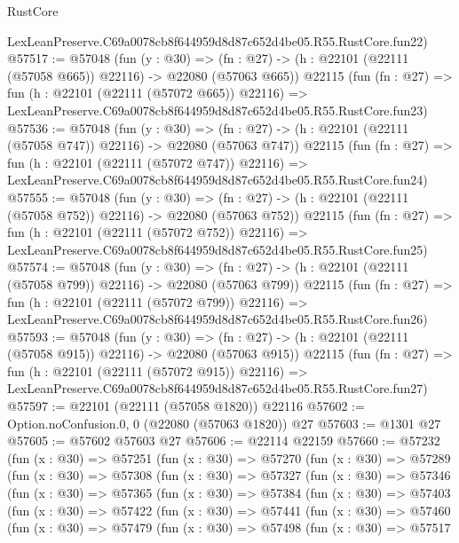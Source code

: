 \begin{lexlean}{RustCore}
\begin{coremodule}
    LexLeanPreserve.C69a0078cb8f644959d8d87c652d4be05.R55.RustCore.fun22)
@57517 := @57048
    (fun (y : @30) =>
    (fn : @27) -> (h : @22101 (@22111 (@57058 @665)) @22116) -> @22080 (@57063 @665))
    @22115
    (fun (fn : @27) =>
    fun (h : @22101 (@22111 (@57072 @665)) @22116) =>
    LexLeanPreserve.C69a0078cb8f644959d8d87c652d4be05.R55.RustCore.fun23)
@57536 := @57048
    (fun (y : @30) =>
    (fn : @27) -> (h : @22101 (@22111 (@57058 @747)) @22116) -> @22080 (@57063 @747))
    @22115
    (fun (fn : @27) =>
    fun (h : @22101 (@22111 (@57072 @747)) @22116) =>
    LexLeanPreserve.C69a0078cb8f644959d8d87c652d4be05.R55.RustCore.fun24)
@57555 := @57048
    (fun (y : @30) =>
    (fn : @27) -> (h : @22101 (@22111 (@57058 @752)) @22116) -> @22080 (@57063 @752))
    @22115
    (fun (fn : @27) =>
    fun (h : @22101 (@22111 (@57072 @752)) @22116) =>
    LexLeanPreserve.C69a0078cb8f644959d8d87c652d4be05.R55.RustCore.fun25)
@57574 := @57048
    (fun (y : @30) =>
    (fn : @27) -> (h : @22101 (@22111 (@57058 @799)) @22116) -> @22080 (@57063 @799))
    @22115
    (fun (fn : @27) =>
    fun (h : @22101 (@22111 (@57072 @799)) @22116) =>
    LexLeanPreserve.C69a0078cb8f644959d8d87c652d4be05.R55.RustCore.fun26)
@57593 := @57048
    (fun (y : @30) =>
    (fn : @27) -> (h : @22101 (@22111 (@57058 @915)) @22116) -> @22080 (@57063 @915))
    @22115
    (fun (fn : @27) =>
    fun (h : @22101 (@22111 (@57072 @915)) @22116) =>
    LexLeanPreserve.C69a0078cb8f644959d8d87c652d4be05.R55.RustCore.fun27)
@57597 := @22101 (@22111 (@57058 @1820)) @22116
@57602 := Option.noConfusion.{0, 0} (@22080 (@57063 @1820)) @27
@57603 := @1301 @27
@57605 := @57602 @57603 @27
@57606 := @22114 @22159
@57660 := @57232
    (fun (x : @30) =>
    @57251
      (fun (x : @30) =>
      @57270
        (fun (x : @30) =>
        @57289
          (fun (x : @30) =>
          @57308
            (fun (x : @30) =>
            @57327
              (fun (x : @30) =>
              @57346
                (fun (x : @30) =>
                @57365
                  (fun (x : @30) =>
                  @57384
                    (fun (x : @30) =>
                    @57403
                      (fun (x : @30) =>
                      @57422
                        (fun (x : @30) =>
                        @57441
                          (fun (x : @30) =>
                          @57460
                            (fun (x : @30) =>
                            @57479
                              (fun (x : @30) =>
                              @57498
                                (fun (x : @30) =>
                                @57517

\end{coremodule}
\end{lexlean}
